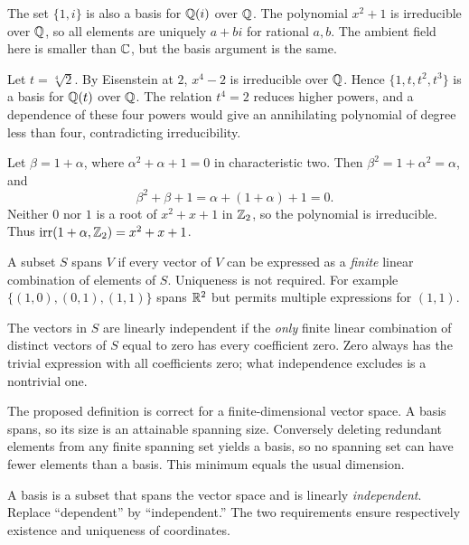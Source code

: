 The set $\{1,i\}$ is also a basis for $\mathbb{Q}(i)$ over $\mathbb{Q}$. The polynomial $x^2+1$ is irreducible over $\mathbb{Q}$, so all elements are uniquely $a+bi$ for rational $a,b$. The ambient field here is smaller than $\mathbb{C}$, but the basis argument is the same.

Let $t=\sqrt[4]2$. By Eisenstein at $2$, $x^4-2$ is irreducible over $\mathbb{Q}$. Hence $\{1,t,t^2,t^3\}$ is a basis for $\mathbb{Q}(t)$ over $\mathbb{Q}$. The relation $t^4=2$ reduces higher powers, and a dependence of these four powers would give an annihilating polynomial of degree less than four, contradicting irreducibility.

Let $\beta=1+\alpha$, where $\alpha^2+\alpha+1=0$ in characteristic two. Then $\beta^2=1+\alpha^2=\alpha$, and
\[\beta^2+\beta+1=\alpha+(1+\alpha)+1=0.\]
Neither $0$ nor $1$ is a root of $x^2+x+1$ in $\mathbb{Z}_2$, so the polynomial is irreducible. Thus $\operatorname{irr}(1+\alpha,\mathbb{Z}_2)=x^2+x+1$.

A subset $S$ spans $V$ if every vector of $V$ can be expressed as a \emph{finite} linear combination of elements of $S$. Uniqueness is not required. For example $\{(1,0),(0,1),(1,1)\}$ spans $\mathbb{R}^2$ but permits multiple expressions for $(1,1)$.

The vectors in $S$ are linearly independent if the \emph{only} finite linear combination of distinct vectors of $S$ equal to zero has every coefficient zero. Zero always has the trivial expression with all coefficients zero; what independence excludes is a nontrivial one.

The proposed definition is correct for a finite-dimensional vector space. A basis spans, so its size is an attainable spanning size. Conversely deleting redundant elements from any finite spanning set yields a basis, so no spanning set can have fewer elements than a basis. This minimum equals the usual dimension.

A basis is a subset that spans the vector space and is linearly \emph{independent}. Replace ``dependent'' by ``independent.'' The two requirements ensure respectively existence and uniqueness of coordinates.

